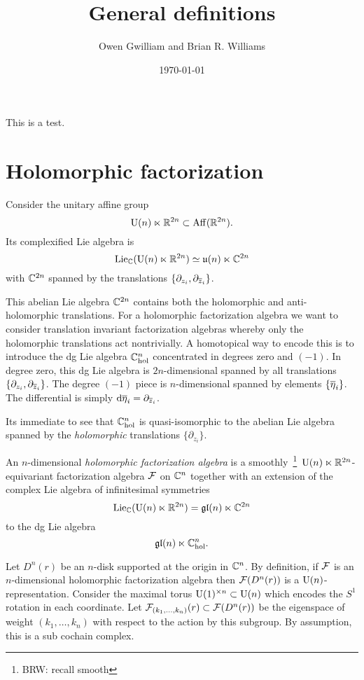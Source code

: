 \documentclass[11pt]{amsart}
\author{Owen Gwilliam and Brian R. Williams}
\date{\today}
\title{General definitions}
\def\U{{\rm U}}
\def\brian#1{{\textcolor{blue!65!red}{BRW: {#1}}}}
\begin{document}
\maketitle

This is a test.

\section{Holomorphic factorization}

Consider the unitary affine group 
\[
\U(n) \ltimes \RR^{2n} \subset {\rm Aff}(\RR^{2n}) .
\]
Its complexified Lie algebra is
\[
{\rm Lie}_{\CC} (\U(n) \ltimes \RR^{2n}) \simeq \mathfrak{u}(n) \ltimes \CC^{2n}
\]
with $\CC^{2n}$ spanned by the translations $\{\partial_{z_i}, \partial_{\zbar_i}\}$. 

This abelian Lie algebra $\CC^{2n}$ contains both the holomorphic and anti-holomorphic translations. 
For a holomorphic factorization algebra we want to consider translation invariant factorization algebras whereby only the holomorphic translations act nontrivially. 
A homotopical way to encode this is to introduce the dg Lie algebra $\CC^{n}_{\rm hol}$ concentrated in degrees zero and $(-1)$. 
In degree zero, this dg Lie algebra is $2n$-dimensional spanned by all translations $\{\partial_{z_i}, \partial_{\zbar_i}\}$.
The degree $(-1)$ piece is $n$-dimensional spanned by elements $\{\Bar{\eta}_i\}$. 
The differential is simply $\d \Bar{\eta}_i = \partial_{\zbar_i}$. 

Its immediate to see that $\CC^n_{\rm hol}$ is quasi-isomorphic to the abelian Lie algebra spanned by the {\em holomorphic} translations $\{\partial_{z_i}\}$. 

\begin{dfn}
An $n$-dimensional {\em holomorphic factorization algebra} is a smoothly~\footnote{\brian{recall smooth}}~$\U(n) \ltimes \RR^{2n}$-equivariant factorization algebra $\cF$ on $\CC^n$ together with an extension of the complex Lie algebra of infinitesimal symmetries
\[
{\rm Lie}_{\CC} (\U(n) \ltimes \RR^{2n}) = \mathfrak{gl}(n) \ltimes \CC^{2n}
\]
to the dg Lie algebra 
\[
\mathfrak{gl}(n) \ltimes \CC^{n}_{\rm hol} .
\]
\end{dfn}


Let $D^n(r)$ be an $n$-disk supported at the origin in $\CC^n$. 
By definition, if $\cF$ is an $n$-dimensional holomorphic factorization algebra then $\cF(D^n (r))$ is a $\U(n)$-representation. 
Consider the maximal torus $\U(1)^{\times n} \subset \U(n)$ which encodes the $S^1$ rotation in each coordinate. 
Let $\cF_{(k_1,\ldots, k_n)}(r) \subset \cF(D^n(r))$ be the eigenspace of weight $(k_1,\ldots, k_n)$ with respect to the action by this subgroup. 
By assumption, this is a sub cochain complex.
\end{document}
